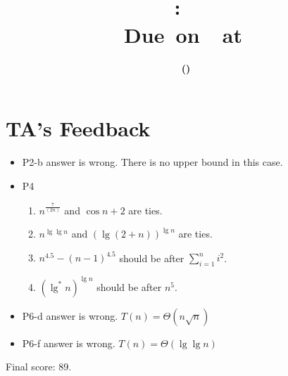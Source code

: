 \documentclass[12pt,letterpaper,titlepage,en-US]{article}
\title{
    \vspace{2in}
    \textmd{\textbf{\hmwkClassName \\\hmwkClass:\ \hmwkTitle}}\\
    \normalsize\vspace{0.1in}\small{Due\ on\ \DTMusedate{DueDate}\ at \DTMusetime{DueDate} }\\
    \vspace{0.1in}\large{\textit{\hmwkClassInstructor}}
    \vspace{3in}
}
\author{\textbf{\hmwkAuthorName\ \footnotesize{(\hmwkAuthorNetID)}} \\ \hmwkAuthorUTDEmail}
\date{}
\begin{document}
\maketitle
\tableofcontents

\pagebreak









\section*{TA's Feedback}
\begin{itemize}
    \item P2-b answer is wrong. There is no upper bound in this case.
    \item P4
        \begin{enumerate}
            \item $n^{\frac{7}{(2n)}}$ and $\cos{n} + 2$ are ties.
            \item $n^{\lg\lg n}$ and $(\lg(2+n))^{\lg n}$ are ties.
            \item $n^{4.5}-(n-1)^{4.5}$ should be after $\sum_{i = 1}^n i^2$.
            \item $(\lg^*n)^{\lg n}$ should be after $n^5$.
        \end{enumerate}
    \item P6-d answer is wrong. $T(n) = \Theta(n\sqrt{n})$
    \item P6-f answer is wrong. $T(n) = \Theta(\lg\lg n)$
\end{itemize}
Final score: 89.
\end{document}
